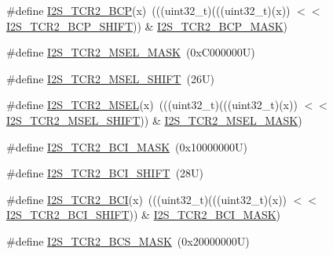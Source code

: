 \begin{DoxyCompactItemize}
\#define \mbox{\hyperlink{group___i2_s___register___masks_gad61cc7161583ab9401ff3e8be5ce1517}{I2\+S\+\_\+\+T\+C\+R2\+\_\+\+B\+CP}}(x)~(((uint32\+\_\+t)(((uint32\+\_\+t)(x)) $<$$<$ \mbox{\hyperlink{group___i2_s___register___masks_gaafb7626321ba09185e45c9136b804732}{I2\+S\+\_\+\+T\+C\+R2\+\_\+\+B\+C\+P\+\_\+\+S\+H\+I\+FT}})) \& \mbox{\hyperlink{group___i2_s___register___masks_gacd80d1c94434950d1e8bd33024b04018}{I2\+S\+\_\+\+T\+C\+R2\+\_\+\+B\+C\+P\+\_\+\+M\+A\+SK}})
\item 
\#define \mbox{\hyperlink{group___i2_s___register___masks_ga69d35574d74902b5a5dac263afe83957}{I2\+S\+\_\+\+T\+C\+R2\+\_\+\+M\+S\+E\+L\+\_\+\+M\+A\+SK}}~(0x\+C000000\+U)
\item 
\#define \mbox{\hyperlink{group___i2_s___register___masks_ga3f2208b190e1f9a951d300e726f6df76}{I2\+S\+\_\+\+T\+C\+R2\+\_\+\+M\+S\+E\+L\+\_\+\+S\+H\+I\+FT}}~(26\+U)
\item 
\#define \mbox{\hyperlink{group___i2_s___register___masks_ga25200cfc40c741f71b96bb14ada7c47f}{I2\+S\+\_\+\+T\+C\+R2\+\_\+\+M\+S\+EL}}(x)~(((uint32\+\_\+t)(((uint32\+\_\+t)(x)) $<$$<$ \mbox{\hyperlink{group___i2_s___register___masks_ga3f2208b190e1f9a951d300e726f6df76}{I2\+S\+\_\+\+T\+C\+R2\+\_\+\+M\+S\+E\+L\+\_\+\+S\+H\+I\+FT}})) \& \mbox{\hyperlink{group___i2_s___register___masks_ga69d35574d74902b5a5dac263afe83957}{I2\+S\+\_\+\+T\+C\+R2\+\_\+\+M\+S\+E\+L\+\_\+\+M\+A\+SK}})
\item 
\#define \mbox{\hyperlink{group___i2_s___register___masks_ga1e16e8f58e2213ea6ea8fbe96f6b0b09}{I2\+S\+\_\+\+T\+C\+R2\+\_\+\+B\+C\+I\+\_\+\+M\+A\+SK}}~(0x10000000\+U)
\item 
\#define \mbox{\hyperlink{group___i2_s___register___masks_gaa9612abbad00a02a4d3dc1a7dfe6463d}{I2\+S\+\_\+\+T\+C\+R2\+\_\+\+B\+C\+I\+\_\+\+S\+H\+I\+FT}}~(28\+U)
\item 
\#define \mbox{\hyperlink{group___i2_s___register___masks_ga5e192671fc355bfb6578c7596158633d}{I2\+S\+\_\+\+T\+C\+R2\+\_\+\+B\+CI}}(x)~(((uint32\+\_\+t)(((uint32\+\_\+t)(x)) $<$$<$ \mbox{\hyperlink{group___i2_s___register___masks_gaa9612abbad00a02a4d3dc1a7dfe6463d}{I2\+S\+\_\+\+T\+C\+R2\+\_\+\+B\+C\+I\+\_\+\+S\+H\+I\+FT}})) \& \mbox{\hyperlink{group___i2_s___register___masks_ga1e16e8f58e2213ea6ea8fbe96f6b0b09}{I2\+S\+\_\+\+T\+C\+R2\+\_\+\+B\+C\+I\+\_\+\+M\+A\+SK}})
\item 
\#define \mbox{\hyperlink{group___i2_s___register___masks_ga8969a374d290181e8f2c7a1c5ff4f31b}{I2\+S\+\_\+\+T\+C\+R2\+\_\+\+B\+C\+S\+\_\+\+M\+A\+SK}}~(0x20000000\+U)
\item 
$$
\end{DoxyCompactItemize}
